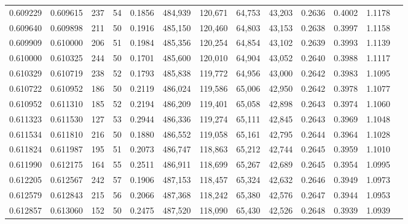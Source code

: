 \begin{tabular}{rrrrrrrrrrrrr}
0.609229 & 0.609615 &    237 &    54 &                                     0.1856 & 484,939 & 120,671 &  64,753 &  43,203 & 0.2636 & 0.4002 & 1.1178 \\
0.609640 & 0.609898 &    211 &    50 &                                     0.1916 & 485,150 & 120,460 &  64,803 &  43,153 & 0.2638 & 0.3997 & 1.1158 \\
0.609909 & 0.610000 &    206 &    51 &                                     0.1984 & 485,356 & 120,254 &  64,854 &  43,102 & 0.2639 & 0.3993 & 1.1139 \\
0.610000 & 0.610325 &    244 &    50 &                                     0.1701 & 485,600 & 120,010 &  64,904 &  43,052 & 0.2640 & 0.3988 & 1.1117 \\
0.610329 & 0.610719 &    238 &    52 &                                     0.1793 & 485,838 & 119,772 &  64,956 &  43,000 & 0.2642 & 0.3983 & 1.1095 \\
0.610722 & 0.610952 &    186 &    50 &                                     0.2119 & 486,024 & 119,586 &  65,006 &  42,950 & 0.2642 & 0.3978 & 1.1077 \\
0.610952 & 0.611310 &    185 &    52 &                                     0.2194 & 486,209 & 119,401 &  65,058 &  42,898 & 0.2643 & 0.3974 & 1.1060 \\
0.611323 & 0.611530 &    127 &    53 &                                     0.2944 & 486,336 & 119,274 &  65,111 &  42,845 & 0.2643 & 0.3969 & 1.1048 \\
0.611534 & 0.611810 &    216 &    50 &                                     0.1880 & 486,552 & 119,058 &  65,161 &  42,795 & 0.2644 & 0.3964 & 1.1028 \\
0.611824 & 0.611987 &    195 &    51 &                                     0.2073 & 486,747 & 118,863 &  65,212 &  42,744 & 0.2645 & 0.3959 & 1.1010 \\
0.611990 & 0.612175 &    164 &    55 &                                     0.2511 & 486,911 & 118,699 &  65,267 &  42,689 & 0.2645 & 0.3954 & 1.0995 \\
0.612205 & 0.612567 &    242 &    57 &                                     0.1906 & 487,153 & 118,457 &  65,324 &  42,632 & 0.2646 & 0.3949 & 1.0973 \\
0.612579 & 0.612843 &    215 &    56 &                                     0.2066 & 487,368 & 118,242 &  65,380 &  42,576 & 0.2647 & 0.3944 & 1.0953 \\
0.612857 & 0.613060 &    152 &    50 &                                     0.2475 & 487,520 & 118,090 &  65,430 &  42,526 & 0.2648 & 0.3939 & 1.0939 \\

\end{tabular}
